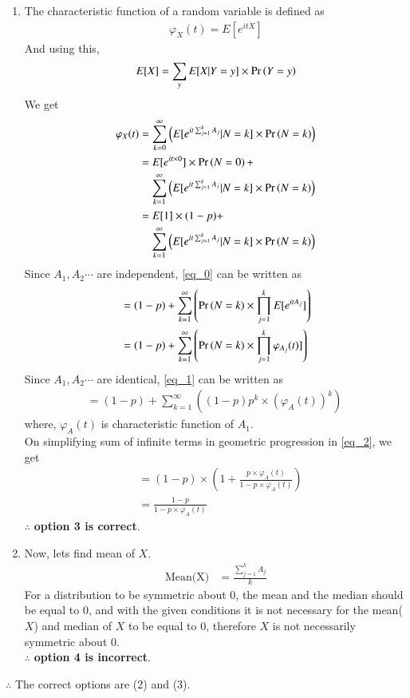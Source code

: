 \documentclass[journal,12pt,twocolumn]{IEEEtran}
\begin{document}
\begin{enumerate}
\item The characteristic function of a random variable is defined as
\begin{align}
    \varphi_X(t)=E[e^{itX}]
\end{align}
And using this,
\begin{align}
    E[X]=\sum_{y} E[X|Y=y]\times \Pr\left(Y=y\right)
\end{align}
We get 
\begin{align}
    \varphi_X(t)&=\sum_{k=0}^{\infty}\left(E[e^{it\sum_{j=1}^{k} A_j}
    |N=k]\times \pr{N=k}\right)\\
    &\begin{multlined}
    =E[e^{it\times 0}]\times \pr{N=0}+\\
    \sum_{k=1}^{\infty}\left(E[e^{it\sum_{j=1}^{k} A_j}
    |N=k]\times \pr{N=k}\right)
    \end{multlined}\\
    &\begin{multlined}
    =E[1]\times (1-p)+\\
    \sum_{k=1}^{\infty}\left(E[e^{it\sum_{j=1}^{k} A_j}|N=k]\times \pr{N=k}\right) \label{eq_0}
    \end{multlined}\\
\end{align}
Since $A_1,A_2\cdots$ are independent, \eqref{eq_0} can be written as
\begin{align}
    &=(1-p)+\sum_{k=1}^{\infty}\left(\Pr\left(N=k\right)\times\prod_{j=1}^k E[e^{itA_j}]\right) \\
    &=(1-p)+\sum_{k=1}^{\infty}\left(\Pr\left(N=k\right)\times\prod_{j=1}^k \varphi_{A_j}(t)]\right) \label{eq_1}
\end{align}
Since $A_1,A_2\cdots$ are identical, \eqref{eq_1} can be written as
\begin{align}
    =(1-p)+\sum_{k=1}^{\infty}\left((1-p)p^k\times(\varphi_{A}(t))^k\right)\;\label{eq_2}
\end{align}
where, $\varphi_{A}(t)$ is characteristic function of $A_1$.\\
On simplifying sum of infinite terms in geometric progression in \eqref{eq_2}, we get
\begin{align}
    &=(1-p)\times \left(1+\frac{p\times \varphi_A(t)}{1-p\times \varphi_A(t)}\right)\\
    &=\frac{1-p}{1-p\times \varphi_A(t) }
\end{align}
$\therefore$ \textbf{option 3 is correct}.\\

\item Now, lets find mean of $X$.
\begin{align}
    \text{Mean(X)}&=\frac{\sum_{j=1}^{k} A_j}{k}
\end{align}
For a distribution to be symmetric about 0, the mean and the median should be equal to 0, and with the given conditions it is not necessary for the mean($X$) and median of $X$ to be equal to 0, therefore $X$ is not necessarily symmetric about 0.\\
$\therefore$ \textbf{option 4 is incorrect}.
\end{enumerate}
$\therefore$ The correct options are (2) and (3).
\end{document}
